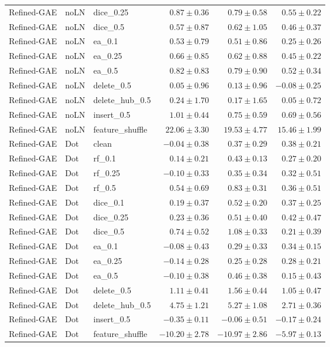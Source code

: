 \documentclass[UTF8,a4paper,11pt,fontset=fandol]{ctexart}
\begin{document}
{\begin{longtable}{lllrrr}
Refined-GAE & noLN & dice\_0.25 & $0.87\pm0.36$ & $0.79\pm0.58$ & $0.55\pm0.22$ \\
Refined-GAE & noLN & dice\_0.5 & $0.57\pm0.87$ & $0.62\pm1.05$ & $0.46\pm0.37$ \\
Refined-GAE & noLN & ea\_0.1 & $0.53\pm0.79$ & $0.51\pm0.86$ & $0.25\pm0.26$ \\
Refined-GAE & noLN & ea\_0.25 & $0.66\pm0.85$ & $0.62\pm0.88$ & $0.45\pm0.22$ \\
Refined-GAE & noLN & ea\_0.5 & $0.82\pm0.83$ & $0.79\pm0.90$ & $0.52\pm0.34$ \\
Refined-GAE & noLN & delete\_0.5 & $0.05\pm0.96$ & $0.13\pm0.96$ & $-0.08\pm0.25$ \\
Refined-GAE & noLN & delete\_hub\_0.5 & $0.24\pm1.70$ & $0.17\pm1.65$ & $0.05\pm0.72$ \\
Refined-GAE & noLN & insert\_0.5 & $1.01\pm0.44$ & $0.75\pm0.59$ & $0.69\pm0.56$ \\
Refined-GAE & noLN & feature\_shuffle & $22.06\pm3.30$ & $19.53\pm4.77$ & $15.46\pm1.99$ \\
Refined-GAE & Dot & clean & $-0.04\pm0.38$ & $0.37\pm0.29$ & $0.38\pm0.21$ \\
Refined-GAE & Dot & rf\_0.1 & $0.14\pm0.21$ & $0.43\pm0.13$ & $0.27\pm0.20$ \\
Refined-GAE & Dot & rf\_0.25 & $-0.10\pm0.33$ & $0.35\pm0.34$ & $0.32\pm0.51$ \\
Refined-GAE & Dot & rf\_0.5 & $0.54\pm0.69$ & $0.83\pm0.31$ & $0.36\pm0.51$ \\
Refined-GAE & Dot & dice\_0.1 & $0.19\pm0.37$ & $0.52\pm0.20$ & $0.37\pm0.25$ \\
Refined-GAE & Dot & dice\_0.25 & $0.23\pm0.36$ & $0.51\pm0.40$ & $0.42\pm0.47$ \\
Refined-GAE & Dot & dice\_0.5 & $0.74\pm0.52$ & $1.08\pm0.33$ & $0.21\pm0.39$ \\
Refined-GAE & Dot & ea\_0.1 & $-0.08\pm0.43$ & $0.29\pm0.33$ & $0.34\pm0.15$ \\
Refined-GAE & Dot & ea\_0.25 & $-0.14\pm0.28$ & $0.25\pm0.28$ & $0.28\pm0.21$ \\
Refined-GAE & Dot & ea\_0.5 & $-0.10\pm0.38$ & $0.46\pm0.38$ & $0.15\pm0.43$ \\
Refined-GAE & Dot & delete\_0.5 & $1.11\pm0.41$ & $1.56\pm0.44$ & $1.05\pm0.47$ \\
Refined-GAE & Dot & delete\_hub\_0.5 & $4.75\pm1.21$ & $5.27\pm1.08$ & $2.71\pm0.36$ \\
Refined-GAE & Dot & insert\_0.5 & $-0.35\pm0.11$ & $-0.06\pm0.51$ & $-0.17\pm0.24$ \\
Refined-GAE & Dot & feature\_shuffle & $-10.20\pm2.78$ & $-10.97\pm2.86$ & $-5.97\pm0.13$ \\
\end{longtable}
}
\end{document}

